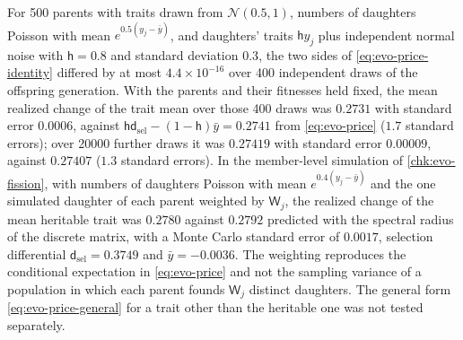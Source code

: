 \begin{numcheck}\label{chk:evo-price}
For 500 parents with traits drawn from $\mathcal N(0.5,1)$, numbers of daughters Poisson with mean $e^{0.5(y_j-\bar y)}$, and daughters' traits $\mathsf hy_j$ plus independent normal noise with $\mathsf h=0.8$ and standard deviation $0.3$, the two sides of \eqref{eq:evo-price-identity} differed by at most $4.4\times10^{-16}$ over 400 independent draws of the offspring generation. With the parents and their fitnesses held fixed, the mean realized change of the trait mean over those 400 draws was $0.2731$ with standard error $0.0006$, against $\mathsf h\mathsf d_{\mathrm{sel}}-(1-\mathsf h)\bar y=0.2741$ from \eqref{eq:evo-price} ($1.7$ standard errors); over 20000 further draws it was $0.27419$ with standard error $0.00009$, against $0.27407$ ($1.3$ standard errors). In the member-level simulation of \cref{chk:evo-fission}, with numbers of daughters Poisson with mean $e^{0.4(y_j-\bar y)}$ and the one simulated daughter of each parent weighted by $\mathsf W_j$, the realized change of the mean heritable trait was $0.2780$ against $0.2792$ predicted with the spectral radius of the discrete matrix, with a Monte Carlo standard error of $0.0017$, selection differential $\mathsf d_{\mathrm{sel}}=0.3749$ and $\bar y=-0.0036$. The weighting reproduces the conditional expectation in \eqref{eq:evo-price} and not the sampling variance of a population in which each parent founds $\mathsf W_j$ distinct daughters. The general form \eqref{eq:evo-price-general} for a trait other than the heritable one was not tested separately.
\end{numcheck}

